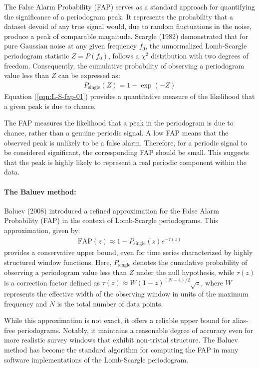     			The False Alarm Probability (FAP) serves as a standard approach for quantifying the significance of a periodogram peak. It represents the probability that a dataset devoid of any true signal would, due to random fluctuations in the noise, produce a peak of comparable magnitude. Scargle (1982) demonstrated that for pure Gaussian noise at any given frequency $f_0$, the unnormalized Lomb-Scargle periodogram statistic $Z=P(f_0)$, follows a $\chi^2$ distribution with two degrees of freedom. Consequently, the cumulative probability of observing a periodogram value less than $Z$ can be expressed as:
    			\begin{align}
    				P_\text{single}(Z)=1-\exp(-Z) \label{eqn:L-S-fap-01}
    			\end{align}
    			Equation (\ref{eqn:L-S-fap-01}) provides a quantitative measure of the likelihood that a given peak is due to chance.
    			
    			The FAP measures the likelihood that a peak in the periodogram is due to chance, rather than a genuine periodic signal. A low FAP means that the observed peak is unlikely to be a false alarm. Therefore, for a periodic signal to be considered significant, the corresponding FAP should be small. This suggests that the peak is highly likely to represent a real periodic component within the data.
    			
    			\paragraph{The Baluev method:}
    			Baluev (2008) \cite{baluev2008assessing} introduced a refined approximation for the False Alarm Probability (FAP) in the context of Lomb-Scargle periodograms. This approximation, given by:
    			\begin{align}
    				\text{FAP}(z)\approx 1 - P_\text{single}(z)e^{-\tau(z)}\label{eqn:L-S-fap-baluev-01}
    			\end{align}
    			provides a conservative upper bound, even for time series characterized by highly structured window functions. Here, $P_\text{single}$ denotes the cumulative probability of observing a periodogram value less than $Z$ under the null hypothesis, while $\tau(z)$ is a correction factor defined as $\tau(z)\approx W(1 - z)^{(N-4)/2}\sqrt{z}$, where $W$ represents the effective width of the observing window in units of the maximum frequency and $N$ is the total number of data points.
    			
    			While this approximation is not exact, it offers a reliable upper bound for alias-free periodograms. Notably, it maintains a reasonable degree of accuracy even for more realistic survey windows that exhibit non-trivial structure. The Baluev method has become the standard algorithm for computing the FAP in many software implementations of the Lomb-Scargle periodogram.
    		
